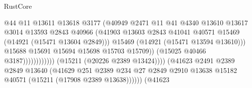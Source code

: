 \begin{lexlean}{RustCore}
\begin{coremodule}
                                                    @44
                                                    @11
                                                    @13611
                                                    @13618
                                                    @3177
                                                    (@40949
                                                      @2471
                                                      @11
                                                      @41
                                                      @4340
                                                      @13610
                                                      @13617
                                                      @3014
                                                      @13593
                                                      @2843
                                                      @40966
                                                      (@41903
                                                        @13603
                                                        @2843
                                                        @41041
                                                        @40571
                                                        @15469
                                                        (@14921 (@15471 @13604 @2849)))
                                                      @15469
                                                      (@14921 (@15471 @13594 @13610)))
                                                    @15688
                                                    @15691
                                                    @15694
                                                    @15698
                                                    @15703
                                                    @15709))
                                                (@15025 @40466 @3187))))))))))))
                          (@15211 (@20226 @2389 @13424))))
                      (@41623
                        @2491
                        @2389
                        @2849
                        @13640
                        (@41629
                          @251
                          @2389
                          @234
                          @27
                          @2849
                          @2910
                          @13638
                          @15182
                          @40571
                          (@15211 (@17908 @2389 @13638))))))
                  (@41623

\end{coremodule}
\end{lexlean}
